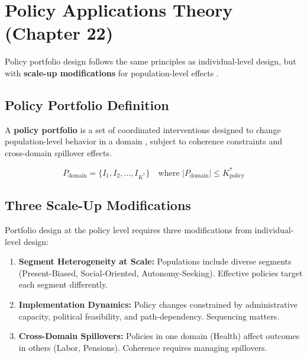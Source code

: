 \section{Policy Applications Theory (Chapter 22)}
\label{sec:mp-policy-applications}

Policy portfolio design follows the same principles as individual-level design, but with
\textbf{scale-up modifications} for population-level effects \citep{sunstein2014nudge, benartzi2017should, thaler2008}.

\subsection{Policy Portfolio Definition}

A \textbf{policy portfolio} is a set of coordinated interventions designed to change
population-level behavior in a domain \citep{halpern2015, service2014think}, subject to coherence constraints and cross-domain
spillover effects.

\begin{equation}
\boxed{
P_{\text{domain}} = \{I_1, I_2, \ldots, I_{K^*}\} \quad \text{where } |P_{\text{domain}}| \leq K^*_{\text{policy}}
}
\end{equation}

\subsection{Three Scale-Up Modifications}

Portfolio design at the policy level requires three modifications from individual-level design:

\begin{enumerate}[nosep]
\item \textbf{Segment Heterogeneity at Scale:} Populations include diverse segments (Present-Biased, Social-Oriented, Autonomy-Seeking). Effective policies target each segment differently.

\item \textbf{Implementation Dynamics:} Policy changes constrained by administrative capacity, political feasibility, and path-dependency. Sequencing matters.

\item \textbf{Cross-Domain Spillovers:} Policies in one domain (Health) affect outcomes in others (Labor, Pensions). Coherence requires managing spillovers.
\end{enumerate}

